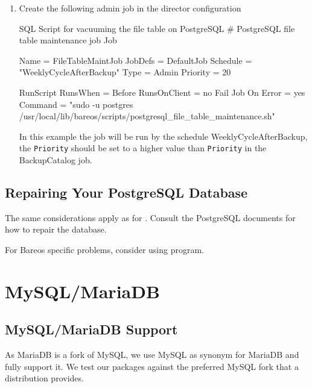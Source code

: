 \begin{enumerate}
\item Create the following admin job in the director configuration
\begin{commands}{SQL Script for vacuuming the file table on PostgreSQL}
# PostgreSQL file table maintenance job
Job {
  Name = FileTableMaintJob
  JobDefs = DefaultJob
  Schedule = "WeeklyCycleAfterBackup"
  Type = Admin
  Priority = 20

  RunScript {
    RunsWhen = Before
    RunsOnClient = no
    Fail Job On Error = yes
    Command = "sudo -u postgres /usr/local/lib/bareos/scripts/postgresql_file_table_maintenance.sh"
  }
}
\end{commands}
In this example the job will be run by the schedule WeeklyCycleAfterBackup,
the \texttt{Priority} should be set to a higher value than \texttt{Priority}
in the BackupCatalog job.
\end{enumerate}


\subsection{Repairing Your PostgreSQL Database}
\label{RepairingPSQL}

The same considerations apply as for .
Consult the PostgreSQL documents for how to repair the database.

For Bareos specific problems,
consider using  program.




\section{MySQL/MariaDB}


\subsection{MySQL/MariaDB Support}
\label{sec:MysqlSupport}

As MariaDB is a fork of MySQL, we use MySQL as synonym for MariaDB and fully support it.
We test our packages against the preferred MySQL fork that a distribution provides.


